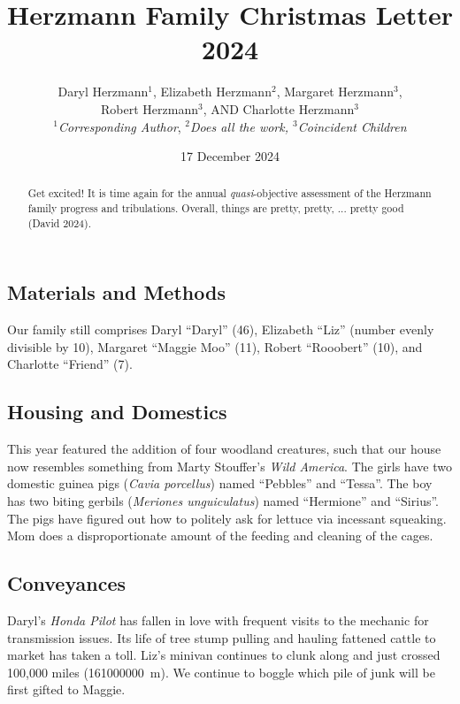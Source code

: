 \documentclass[letterpaper,11pt]{article}
\title{\vspace{-2.0cm}Herzmann Family Christmas Letter 2024}
\author{Daryl Herzmann${}^1$, Elizabeth Herzmann${}^2$, Margaret 
Herzmann${}^3$,\\
Robert Herzmann${}^3$, AND Charlotte Herzmann${}^3$ \\
\textit{${}^1$Corresponding Author},
\it{${}^2$Does all the work},
\it{${}^3$Coincident Children}}
\date{17 December 2024}
\begin{document}
\maketitle
\vspace{-0.75cm}
\begin{abstract}
Get excited! It is time again for the annual \textit{quasi}-objective assessment of the Herzmann
family progress and tribulations. Overall, things are pretty, pretty, ...
pretty good (David 2024).
\end{abstract}

\vspace{-0.5cm}

\noindent\makebox[\linewidth]{\rule{\textwidth}{1pt}}

\begin{multicols}{2}

\section{Materials and Methods} 

Our family still comprises Daryl
\enquote{Daryl} (46), Elizabeth \enquote{Liz} (number evenly divisible by 10),
Margaret \enquote{Maggie Moo} (11), Robert \enquote{Rooobert} (10), and
Charlotte \enquote{Friend} (7).

\subsection{Housing and Domestics}

This year featured the addition of four woodland creatures, such that our
house now resembles something from Marty Stouffer's \textit{Wild America}. The
girls have two domestic guinea pigs (\textit{Cavia porcellus}) named 
\enquote{Pebbles} and \enquote{Tessa}. The boy
has two biting gerbils (\textit{Meriones unguiculatus}) named
\enquote{Hermione} and \enquote{Sirius}.  The pigs have
figured out how to politely ask for lettuce via incessant
squeaking. Mom does a disproportionate amount of the feeding and cleaning of the
cages.


\bigskip

\subsection{Conveyances}

Daryl's \textit{Honda Pilot} has fallen in love with frequent visits to the
mechanic for transmission issues.  Its life of tree stump pulling and hauling
fattened cattle to market has taken a toll.  Liz's minivan continues to
clunk along and just crossed 100,000 miles (\SI{161000000}{\meter}). We continue
to boggle which pile of junk will be first gifted to Maggie.


\end{multicols}
\end{document}
